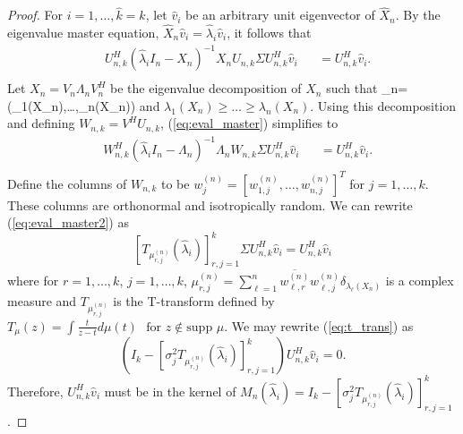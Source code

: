 \begin{proof}
For $i=1,\dots, \widehat{k}=k$, let $\widehat{v}_i$ be an arbitrary unit eigenvector of $\widehat{X}_n$. By the eigenvalue master equation, $\widehat{X}_n\widehat{v}_i=\widehat{\lambda}_i\widehat{v}_i$, it follows that
\begin{equation}\label{eq:eval_master}
\begin{aligned}
  &U_{n,k}^H\left(\widehat{\lambda}_iI_n-X_n\right)^{-1}X_nU_{n,k}\Sigma U_{n,k}^H\widehat{v}_i&&=U_{n,k}^H\widehat{v}_i.\\
\end{aligned}
\end{equation}
Let $X_n=V_n\Lambda_nV_n^H$ be the eigenvalue decomposition of $X_n$ such that 
\be
\Lambda_n=\diag(\lambda_1(X_n),\dots,\lambda_n(X_n))
\ee
 and $\lambda_1(X_n)\geq\dots\geq\lambda_n(X_n)$. Using this decomposition and defining $W_{n,k}=V^HU_{n,k}$, (\ref{eq:eval_master}) simplifies to
\begin{equation}\label{eq:eval_master2}
\begin{aligned}
  &W_{n,k}^H\left(\widehat{\lambda}_iI_n-\Lambda_n\right)^{-1}\Lambda_nW_{n,k}\Sigma U_{n,k}^H\widehat{v}_i&&=U_{n,k}^H\widehat{v}_i.\\
\end{aligned}
\end{equation}
Define the columns of $W_{n,k}$ to be $w_j^{(n)}=[w_{1,j}^{(n)},\dots,w_{n,j}^{(n)}]^T$ for $j=1,\dots,k$. These columns are orthonormal and isotropically random. We can rewrite (\ref{eq:eval_master2}) as
\begin{equation}\label{eq:t_trans}
\left[T_{\mu_{r,j}^{\left(n\right)}}\left(\widehat{\lambda}_i\right)\right]_{r,j=1}^k \Sigma U_{n,k}^H\widehat{v}_i=U_{n,k}^H\widehat{v}_i
\end{equation}
where for $r=1,\dots,k$, $j=1,\dots,k$, $\mu_{r,j}^{\left(n\right)}=\sum_{\ell=1}^n\overline{w_{\ell,r}^{\left(n\right)}}w_{\ell,j}^{\left(n\right)}\delta_{\lambda_\ell\left(X_n\right)}$ is a complex measure and $T_{\mu_{r,j}^{\left(n\right)}}$ is the T-transform defined by $T_{\mu}\left(z\right) = \int\frac{t}{z-t}d\mu\left(t\right)\,\,\,\,\text{for } z\not\in\text{supp } \mu$. We may rewrite (\ref{eq:t_trans}) as
\begin{equation*}
\left(I_k-\left[\sigma_j^2T_{\mu_{r,j}^{\left(n\right)}}\left(\widehat{\lambda}_i\right)\right]_{r,j=1}^k\right)U_{n,k}^H\widehat{v}_i=0.
\end{equation*}
Therefore, $U_{n,k}^H\widehat{v}_i$ must be in the kernel of $M_n\left(\widehat{\lambda}_i\right)=I_k-\left[\sigma_j^2T_{\mu_{r,j}^{\left(n\right)}}\left(\widehat{\lambda}_i\right)\right]_{r,j=1}^k$.

\end{proof}
